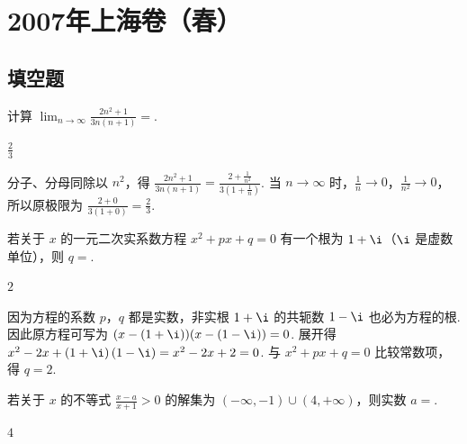 
\chapter{2007年上海卷（春）}

\section{填空题}

\begin{problem}
计算 \( \displaystyle\lim_{n\to\infty}\frac{2n^{2}+1}{3n(n+1)}= \)\fillinblank{}.
\end{problem}

\begin{answer}
\(\frac{2}{3}\)
\end{answer}

\begin{solution}
分子、分母同除以 \(n^2\)，得 \(\frac{2n^{2}+1}{3n(n+1)}=\frac{2+\frac{1}{n^{2}}}{3\left(1+\frac{1}{n}\right)}\). 当 \(n\to\infty\) 时，\(\frac{1}{n}\to0\)，\(\frac{1}{n^2}\to0\)，所以原极限为 \(\frac{2+0}{3(1+0)}=\frac{2}{3}\).
\end{solution}

\begin{problem}
若关于 \(x\) 的一元二次实系数方程 \(x^{2}+px+q=0\) 有一个根为 \(1+\i\)（\(\i\) 是虚数单位），则 \(q=\)\fillinblank{}.
\end{problem}

\begin{answer}
\(2\)
\end{answer}

\begin{solution}
因为方程的系数 \(p\)，\(q\) 都是实数，非实根 \(1+\i\) 的共轭数 \(1-\i\) 也必为方程的根. 因此原方程可写为 \((x-(1+\i))(x-(1-\i))=0\). 展开得 \(x^2-2x+\left(1+\i\right)\left(1-\i\right)=x^2-2x+2=0\).
与 \(x^2+px+q=0\) 比较常数项，得 \(q=2\).
\end{solution}

\begin{problem}
若关于 \(x\) 的不等式 \(\frac{x-a}{x+1}>0\) 的解集为 \((-\infty,-1)\cup(4,+\infty)\)，则实数 \(a=\)\fillinblank{}.
\end{problem}

\begin{answer}
\(4\)
\end{answer}

